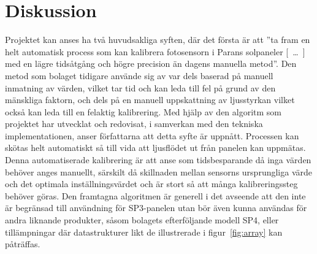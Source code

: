 \section{Diskussion} %
\label{sec:diskussion}

    Projektet kan anses ha två huvudsakliga syften, där det första är att ''ta fram en helt automatisk process som kan kalibrera fotosensorn i Parans solpaneler [~\dots~] med en lägre tidsåtgång och högre precision än dagens manuella metod''. 
    Den metod som bolaget tidigare använde sig av var dels baserad på manuell inmatning av värden, vilket tar tid och kan leda till fel på grund av den mänskliga faktorn, och dels på en manuell uppskattning av ljusstyrkan vilket också kan leda till en felaktig kalibrering. 
    Med hjälp av den algoritm som projektet har utvecklat och redovisat, i samverkan med den tekniska implementationen, anser författarna att detta syfte är uppnått. Processen kan skötas helt automatiskt så till vida att ljusflödet ut från panelen kan uppmätas. 
    Denna automatiserade kalibrering är att anse som tidsbesparande då inga värden behöver anges manuellt, särskilt då skillnaden mellan sensorns ursprungliga värde och det optimala inställningsvärdet och är stort så att många kalibreringssteg behöver göras. Den framtagna algoritmen är generell i det avseende att den inte är begränsad till användning för SP3-panelen utan bör även kunna användas för andra liknande produkter, såsom bolagets efterföljande modell SP4, eller tillämpningar där datastrukturer likt de illustrerade i figur~\ref{fig:array} kan påträffas. \bigskip

